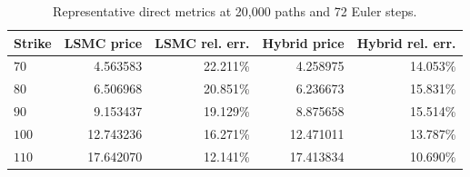\begin{table}[htbp]
\centering
\caption{Representative direct metrics at 20,000 paths and 72 Euler steps.}
\label{tab:bgk_r05_v0114_vp009_t1_delta05_nex12-step72-20k}
\begin{tabular}{lrrrr}
\toprule
Strike & LSMC price & LSMC rel. err. & Hybrid price & Hybrid rel. err. \\
\midrule
$70$ & 4.563583 & 22.211\% & 4.258975 & 14.053\% \\
$80$ & 6.506968 & 20.851\% & 6.236673 & 15.831\% \\
$90$ & 9.153437 & 19.129\% & 8.875658 & 15.514\% \\
$100$ & 12.743236 & 16.271\% & 12.471011 & 13.787\% \\
$110$ & 17.642070 & 12.141\% & 17.413834 & 10.690\% \\
\bottomrule
\end{tabular}
\end{table}
